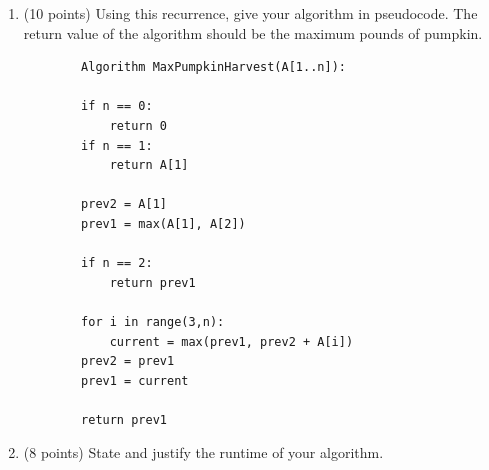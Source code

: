\begin{enumerate}
\begin{solution}
        Pf: 

        \quad For the first \(i\) pumpkins, an optimal selection either 
        
        (1) does not include pumpkin \(i\), giving total \(B[i-1]\); or 
        
        (2) includes pumpkin \(i\), in which case pumpkin \(i-1\) cannot be taken and the total is \(B[i-2]+A[i]\)
        
        The maximum of these two values yields \(B[i]\)
        
        The final answer is \(B[n]\)
        
        The recurrence can be computed in \(O(n)\) time (and \(O(1)\) extra space if we keep only the last two values)

        
        




        
    \end{solution}
    \item (10 points) Using this recurrence, give your algorithm in pseudocode.
    The return value of the algorithm should be the maximum pounds of pumpkin.
    \begin{solution}

        \begin{verbatim}
        Algorithm MaxPumpkinHarvest(A[1..n]):
        
        if n == 0:
            return 0
        if n == 1:
            return A[1]
        
        prev2 = A[1]
        prev1 = max(A[1], A[2])
        
        if n == 2:
            return prev1
        
        for i in range(3,n):
            current = max(prev1, prev2 + A[i])
        prev2 = prev1
        prev1 = current
        
        return prev1
        \end{verbatim}
        

        
    \end{solution}

    
    \item (8 points) State and justify the runtime of your algorithm.
    \begin{solution}
    \vspace{0.5cm}
    

\end{solution}
\end{enumerate}
